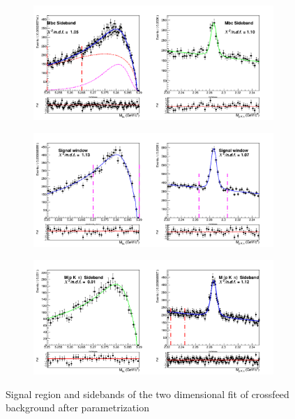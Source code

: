 \begin{figure}[H]
  \begin{subfigure}{15cm}
    \centering\includegraphics[width=14cm]{A1-Appendix/figs/Mbc_Sideband_stream12345_Crossfeed_charged_corrLambdaC_2Dfit_afterParametrization.png}
  \end{subfigure}
  \begin{subfigure}{15cm}
    \centering\includegraphics[width=14cm]{A1-Appendix/figs/Signal_window_stream12345_Crossfeed_charged_corrLambdaC_2Dfit_afterParametrization.png}
  \end{subfigure}

  \begin{subfigure}{15cm}
    \centering\includegraphics[width=14cm]{A1-Appendix/figs/InvM_Sideband_stream12345_Crossfeed_charged_corrLambdaC_2Dfit.png}
  \end{subfigure}
  \caption{Signal region and sidebands of the two dimensional fit of crossfeed background after parametrization}
\end{figure}

